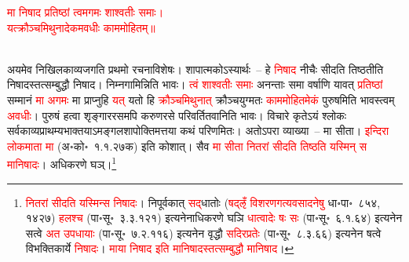 \centering\textcolor{red}{मा निषाद प्रतिष्ठां त्वमगमः शाश्वतीः समाः। \nopagebreak\\
यत्क्रौञ्चमिथुनादेकमवधीः काममोहितम्॥}\nopagebreak\\
\\
\begin{sloppypar}\justifying\noindent\hspace{10mm} अयमेव निखिल\-काव्य\-जगति प्रथमो रचना\-विशेषः। शापात्मकोऽस्यार्थः~– हे \textcolor{red}{निषाद} नीचैः सीदति तिष्ठतीति निषादस्तत्सम्बुद्धौ निषाद। निम्न\-गामिन्निति भावः। \textcolor{red}{त्वं शाश्वतीः समाः} अनन्ताः समा वर्षाणि यावत् \textcolor{red}{प्रतिष्ठां} सम्मानं \textcolor{red}{मा अगमः} मा प्राप्नुहि \textcolor{red}{यत्} यतो हि \textcolor{red}{क्रौञ्च\-मिथुनात्} क्रौञ्च\-युग्मतः \textcolor{red}{काम\-मोहितमेकं} पुरुषमिति भावस्त्वम् \textcolor{red}{अवधीः}। पुरुषं हत्वा शृङ्गार\-रसमपि करुण\-रसे परिवर्तितवानिति भावः। विचारे कृतेऽयं श्लोकः सर्व\-काव्य\-प्राथम्य\-भाक्तयाऽमङ्गलशापोक्तिमत्तया कथं परिणमितः। अतोऽपरा व्याख्या~– मा सीता। \textcolor{red}{इन्दिरा लोक\-माता मा} (अ॰को॰~१.१.२७क) इति कोशात्। सैव \textcolor{red}{मा सीता नितरां सीदति तिष्ठति यस्मिन् स मानिषादः}। अधिकरणे घञ्।\footnote{\textcolor{red}{नितरां सीदति यस्मिन्स निषादः}। निपूर्वकात् \textcolor{red}{सद्‌}\-धातोः (\textcolor{red}{षद्ऌँ विशरण\-गत्यवसादनेषु} धा॰पा॰~८५४, १४२७) \textcolor{red}{हलश्च} (पा॰सू॰~३.३.१२१) इत्यनेनाधिकरणे घञि \textcolor{red}{धात्वादेः षः सः} (पा॰सू॰~६.१.६४) इत्यनेन सत्वे \textcolor{red}{अत उपधायाः} (पा॰सू॰~७.२.११६) इत्यनेन वृद्धौ \textcolor{red}{सदिरप्रतेः} (पा॰सू॰~८.३.६६) इत्यनेन षत्वे विभक्तिकार्ये \textcolor{red}{निषादः}। \textcolor{red}{माया निषाद इति मानिषादस्तत्सम्बुद्धौ मानिषाद}।}

\end{sloppypar}
